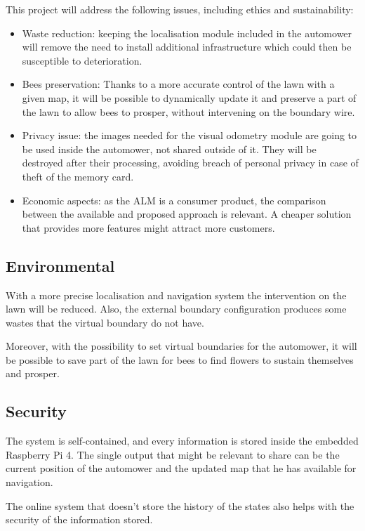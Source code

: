 \noindent This project will address the following issues, including ethics and sustainability:
\begin{itemize}
    \item Waste reduction: keeping the localisation module included in the automower will remove the need to install additional infrastructure which could then be susceptible to deterioration.
    \item Bees preservation: Thanks to a more accurate control of the lawn with a given map, it will be possible to dynamically update it and preserve a part of the lawn to allow bees to prosper, without intervening on the boundary wire.
    \item Privacy issue: the images needed for the visual odometry module are going to be used inside the automower, not shared outside of it. They will be destroyed after their processing, avoiding breach of personal privacy in case of theft of the memory card.
    \item Economic aspects: as the \gls{ALM} is a consumer product, the comparison between the available and proposed approach is relevant. A cheaper solution that provides more features might attract more customers.
\end{itemize}

\subsection{Environmental}
\noindent
With a more precise localisation and navigation system the intervention on the lawn will be reduced.
Also, the external boundary configuration produces some wastes that the virtual boundary do not have.

Moreover, with the possibility to set virtual boundaries for the automower, it will be possible to save part of the lawn for bees to find flowers to sustain themselves and prosper.


\subsection{Security}
\noindent

The system is self-contained, and every information is stored inside the embedded Raspberry Pi 4.
The single output that might be relevant to share can be the current position of the automower and the updated map that he has available for navigation.

The online system that doesn't store the history of the states also helps with the security of the information stored.

